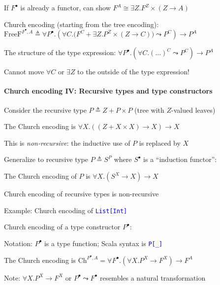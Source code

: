 If $F^{\bullet}$ is already a functor, can show $F^{A}\cong\exists Z.F^{Z}\times\left(Z\rightarrow A\right)$

Church encoding (starting from the tree encoding): $\text{FreeF}^{F^{\bullet},A}\triangleq\forall P^{\bullet}.\left(\forall C.\big(F^{C}+\exists Z.P^{Z}\times\left(Z\rightarrow C\right)\big)\leadsto P^{C}\right)\rightarrow P^{A}$

The structure of the type expression: $\forall P^{\bullet}.\left(\forall C.(...)^{C}\leadsto P^{C}\right)\rightarrow P^{A}$

Cannot move $\forall C$ or $\exists Z$ to the outside of the type
expression!


\paragraph{Church encoding IV: Recursive types and type constructors}

Consider the recursive type {\footnotesize{}$P\triangleq Z+P\times P$}
(tree with $Z$-valued leaves)

The Church encoding is {\footnotesize{}$\forall X.\left(\left(Z+X\times X\right)\rightarrow X\right)\rightarrow X$}{\footnotesize\par}

This is \emph{non-recursive}: the inductive use of $P$ is replaced
by $X$

Generalize to recursive type $P\triangleq S^{P}$ where $S^{\bullet}$
is a \textsf{``}induction functor\textsf{''}:

The Church encoding of $P$ is {\footnotesize{}$\forall X.\left(S^{X}\rightarrow X\right)\rightarrow X$}{\footnotesize\par}

Church encoding of recursive types is non-recursive

Example: Church encoding of \texttt{\textcolor{blue}{\footnotesize{}List{[}Int{]}}} 

Church encoding of a type constructor $P^{\bullet}$:

Notation: $P^{\bullet}$ is a type function; Scala syntax is \texttt{\textcolor{blue}{\footnotesize{}P{[}\_{]}}} 

The Church encoding is {\footnotesize{}$\text{Ch}^{P^{\bullet},A}=\forall F^{\bullet}.\left(\forall X.P^{X}\rightarrow F^{X}\right)\rightarrow F^{A}$}{\footnotesize\par}

Note: $\forall X.P^{X}\rightarrow F^{X}$ or $P^{\bullet}\leadsto F^{\bullet}$
resembles a natural transformation


